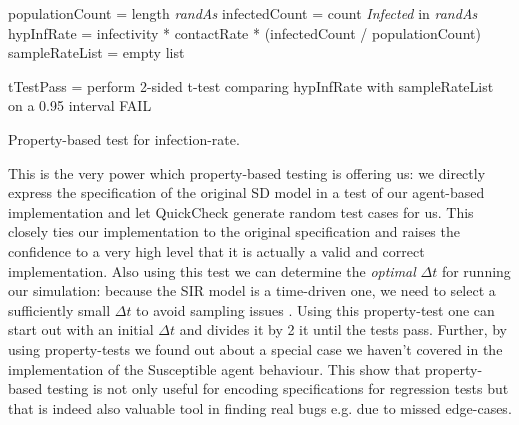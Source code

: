 \begin{algorithm}
populationCount = length \textit{randAs}\;
infectedCount   = count \textit{Infected} in \textit{randAs}\;
hypInfRate      = infectivity * contactRate * (infectedCount / populationCount)\;
sampleRateList  = empty list\;


tTestPass = perform 2-sided t-test comparing hypInfRate with sampleRateList on a 0.95 interval\;
 {
  FAIL\;
}
\caption{Property-based test for infection-rate.}
\end{algorithm}
\label{alg:prop_test_infectionrate}

This is the very power which property-based testing is offering us: we directly express the specification of the original SD model in a test of our agent-based implementation and let QuickCheck generate random test cases for us. This closely ties our implementation to the original specification and raises the confidence to a very high level that it is actually a valid and correct implementation. Also using this test we can determine the \textit{optimal} $\Delta t$ for running our simulation: because the SIR model is a time-driven one, we need to select a sufficiently small $\Delta t$ to avoid sampling issues \cite{thaler_pure_2019}. Using this property-test one can start out with an initial $\Delta t$ and divides it by 2 it until the tests pass.
Further, by using property-tests we found out about a special case we haven't covered in the implementation of the Susceptible agent behaviour. This show that property-based testing is not only useful for encoding specifications for regression tests but that is indeed also valuable tool in finding real bugs e.g. due to missed edge-cases. 